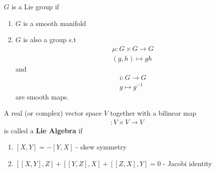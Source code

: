 \documentclass[11pt,a4paper]{scrarticle}
\theoremstyle{definition}
\theoremstyle{greenbox}
\begin{document}
    \begin{defn}
        $ G $ is a Lie group if \begin{enumerate}
            \item $ G $ is a smooth manifold
            \item $ G $ is also a group s.t 
            \begin{align*}
                \mu : G \times G \to G \\
                ( g,h) \mapsto gh
            \end{align*} and 
            \begin{align*}
                i : G \to G \\
                g \mapsto g^{-1}
            \end{align*}
            are smooth maps.
        \end{enumerate}
    \end{defn}
    \begin{defn}
        A real (or complex) vector space $ V $ together with a bilinear map \begin{align*}
            [,] : V \times V \to V
        \end{align*}
        is called a \textbf{Lie Algebra} if \begin{enumerate}
            \item $[X,Y] = -[Y,X]$ - skew symmetry
            \item $[[X,Y],Z]+ [[Y,Z],X]+ [[Z,X],Y] = 0 $ - Jacobi identity
        \end{enumerate}
    \end{defn}
\end{document}
